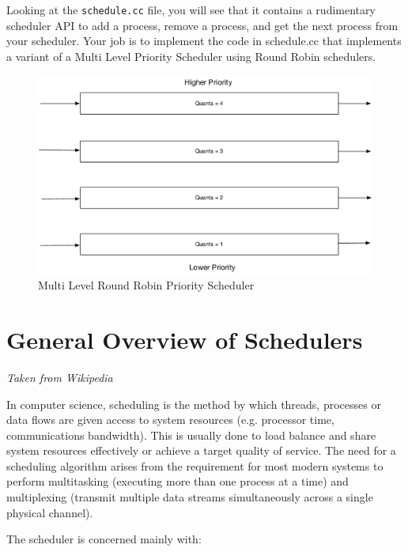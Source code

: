 \documentclass[11pt]{article}
\begin{document}
Looking at the {\tt schedule.cc} file, you will see that it contains a rudimentary scheduler API to add a process, remove a process, and get the next process from your scheduler. Your job is to implement the code in schedule.cc that implements a variant of a Multi Level Priority Scheduler using Round Robin schedulers. 

\begin{figure}[htbp]
  \begin{center}
    \includegraphics[width=150mm]{multilevel.pdf}
    \caption{Multi Level Round Robin Priority Scheduler}
    \label{fig:multilevel}
  \end{center}
\end{figure}

\section*{General Overview of Schedulers}
\emph{Taken from Wikipedia\cite{schedules}}

In computer science, scheduling is the method by which threads, processes or data flows are given access to system resources (e.g. processor time, communications bandwidth). This is usually done to load balance and share system resources effectively or achieve a target quality of service. The need for a scheduling algorithm arises from the requirement for most modern systems to perform multitasking (executing more than one process at a time) and multiplexing (transmit multiple data streams simultaneously across a single physical channel).

The scheduler is concerned mainly with:
\end{document}
